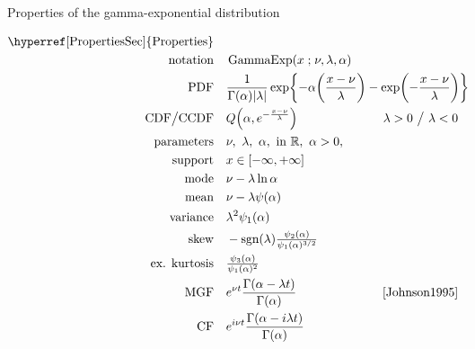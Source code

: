 

\begin{table*}[tp!]
\caption[Gamma-exponential distribution -- Properties]{Properties of the gamma-exponential distribution}
\begin{align*}
\text{\hyperref[PropertiesSec]{Properties}}  \quad& \\
\text{notation} \quad &  \op{GammaExp}(x \given \nu, \lambda, \alpha)  			\checked
\\
\text{PDF}\quad &   \frac{1}{ \Gamma(\alpha) |\lambda|}  \exp\Left\{- \alpha \Left(\frac{x-\nu}{\lambda}\Right) - \exp\Left(-\frac{x-\nu}{\lambda}\Right)  \Right\} \checked \hspace{-8em}												
\\
\text{CDF} \big/ \text{CCDF} \quad  &   Q\Left(\alpha, e^{-\frac{x-\nu}{\lambda} }\Right) 
& \lambda>0 \ \big/ \ \lambda<0  \checked
\\
\text{parameters}\quad &   \nu,\ \lambda,\ \alpha,\   \text{in } \Real, \ \alpha>0, \ 		\checked
\\
\text{support} \quad &   x \in [-\infty, +\infty]									\checked
\\
\text{mode} \quad  & \nu -\lambda \ln \alpha \checked
\\
\text{mean} \quad  &   \nu- \lambda \psi(\alpha)	\checked
\\
\text{variance} \quad  &  \lambda^2 \psi_1(\alpha)	\checked
\\
\text{skew} \quad  &   -\text{sgn}(\lambda) \tfrac{\psi_2(\alpha) }{  \psi_1(\alpha)^{3/2} }  \checked
\\
\text{ex. kurtosis} \quad  &     \tfrac{ \psi_3(\alpha) }{  \psi_1(\alpha)^{2}} \checked
\\
\text{MGF} \quad  &   e^{\nu t } \frac{\Gamma(\alpha-\lambda t)}{\Gamma(\alpha)}  \checked
& \text{\cite{Johnson1995}}  %
\\
\text{CF} \quad  &  e^{i \nu t } \frac{\Gamma(\alpha-i \lambda t)}{\Gamma(\alpha)} \checked
\end{align*}
\end{table*}

